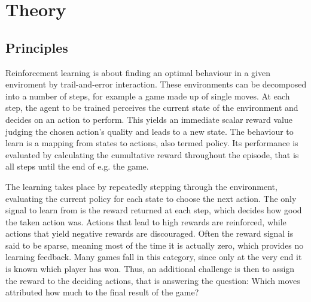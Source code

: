 \chapter{Theory}

\section{Principles}


Reinforcement learning is about finding an optimal behaviour in a given enviroment by
trail-and-error interaction.
These environments can be decomposed into a number of steps, for example a game made up of
single moves.
At each step, the agent to be trained perceives the current state of the environment and
decides on an action to perform.
This yields an immediate scalar reward value judging the chosen action's quality and leads
to a new state.
The behaviour to learn is a mapping from states to actions, also termed policy.
Its performance is evaluated by calculating the cumultative reward throughout the episode,
that is all steps until the end of e.g. the game.

The learning takes place by repeatedly stepping through the environment, evaluating the
current policy for each state to choose the next action.
The only signal to learn from is the reward returned at each step, which decides how good
the taken action was.
Actions that lead to high rewards are reinforced, while actions that yield negative
rewards are discouraged.
Often the reward signal is said to be sparse, meaning most of the time it is actually
zero, which provides no learning feedback.
Many games fall in this category, since only at the very end it is known which player has
won.
Thus, an additional challenge is then to assign the reward to the deciding actions, that
is answering the question:
Which moves attributed how much to the final result of the game?

